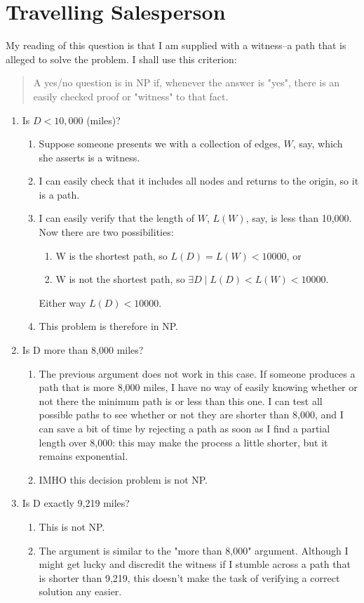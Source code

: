 \documentclass[]{article}
\begin{document}
\section{Travelling Salesperson}

My reading of this question is that I am supplied with a witness--a path that is alleged to solve the problem.
I shall use this criterion: \begin{quotation}
	A yes/no question is in NP if, whenever the answer is "yes", there is an easily checked proof or "witness" to that fact\cite[Lecture 3.5]{sfi2020computation}.
\end{quotation}

\begin{enumerate}
	\item Is $D<10,000$ (miles)?
	\begin{enumerate}
		\item Suppose someone presents we with a collection of edges, 
			$W$, say, which she asserts is a witness.
		\item I can easily check that it includes all nodes and returns to the origin, so it is a path.
		\item I can easily verify that the length of $W$, $L(W)$, say, is less than 10,000. Now there are two possibilities:
		\begin{enumerate}
			\item W is the shortest path, so  $L(D)=L(W)<10000$, or
			\item W is not the shortest path, so $\exists D \mid L(D)<L(W)<10000$.
		\end{enumerate}
		Either way $L(D)<10000$.
		\item This problem is therefore in NP.
	\end{enumerate}
	
	\item Is D more than 8,000 miles?
		\begin{enumerate}
		\item The previous argument does not work in this case. If someone produces a path that is more 8,000 miles, I have no way of easily knowing whether or not there the minimum path is or less than this one. I can test all possible paths to see whether or not they are shorter than 8,000, and I can save a bit of time by rejecting a path as soon as I find a partial length over 8,000: this may make the process a little shorter, but it remains exponential.
		\item IMHO this decision problem is not NP.  
	\end{enumerate}
	
	\item Is D exactly 9,219 miles? 
		\begin{enumerate}
		\item This is not NP.
		\item The argument is similar to the "more than 8,000" argument. Although I might get lucky and discredit the witness if I stumble across a path that is shorter than 9,219, this doesn't make the task of verifying a correct solution any easier. 
	\end{enumerate}
\end{enumerate}
\end{document}
